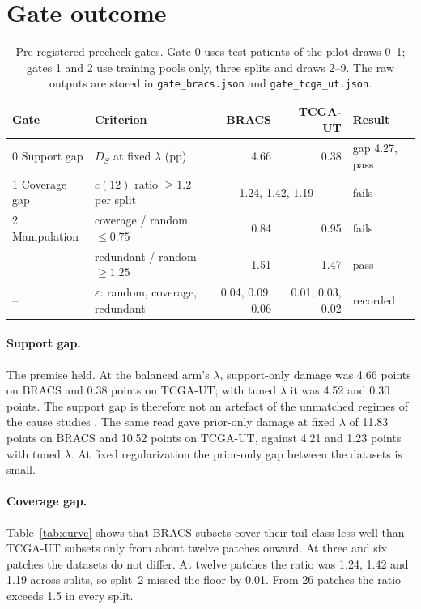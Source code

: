 \documentclass[11pt]{article}
\begin{document}
\section{Gate outcome}
\label{sec:results}
\begin{table}[ht]
  \centering
  \small
  \begin{tabular}{@{}llrrl@{}}
    \toprule
    Gate & Criterion & BRACS & TCGA-UT & Result \\
    \midrule
    0 Support gap  & $D_S$ at fixed $\lambda$ (pp) & 4.66 & 0.38 & gap 4.27, pass \\
    1 Coverage gap & $c(12)$ ratio $\ge 1.2$ per split & \multicolumn{2}{c}{1.24, 1.42, 1.19} & fails \\
    2 Manipulation & coverage / random $\le 0.75$ & 0.84 & 0.95 & fails \\
                   & redundant / random $\ge 1.25$ & 1.51 & 1.47 & pass \\
    \midrule
    -- & $\varepsilon$: random, coverage, redundant & 0.04, 0.09, 0.06 & 0.01, 0.03, 0.02 & recorded \\
    \bottomrule
  \end{tabular}
  \caption{Pre-registered precheck gates. Gate 0 uses test patients of the pilot draws 0--1; gates 1 and 2 use training pools only, three splits and draws 2--9. The raw outputs are stored in \texttt{gate\_bracs.json} and \texttt{gate\_tcga\_ut.json}.}
  \label{tab:gate}
\end{table}

\paragraph{Support gap.} The premise held. At the balanced arm's $\lambda$, support-only damage was 4.66 points on BRACS and 0.38 points on TCGA-UT; with tuned $\lambda$ it was 4.52 and 0.30 points. The support gap is therefore not an artefact of the unmatched regimes of the cause studies \citep{queisler2026causeTcga, queisler2026causeBracs}. The same read gave prior-only damage at fixed $\lambda$ of 11.83 points on BRACS and 10.52 points on TCGA-UT, against 4.21 and 1.23 points with tuned $\lambda$. At fixed regularization the prior-only gap between the datasets is small.

\paragraph{Coverage gap.} Table~\ref{tab:curve} shows that BRACS subsets cover their tail class less well than TCGA-UT subsets only from about twelve patches onward. At three and six patches the datasets do not differ. At twelve patches the ratio was 1.24, 1.42 and 1.19 across splits, so split~2 missed the floor by 0.01. From 26 patches the ratio exceeds 1.5 in every split.
\end{document}
